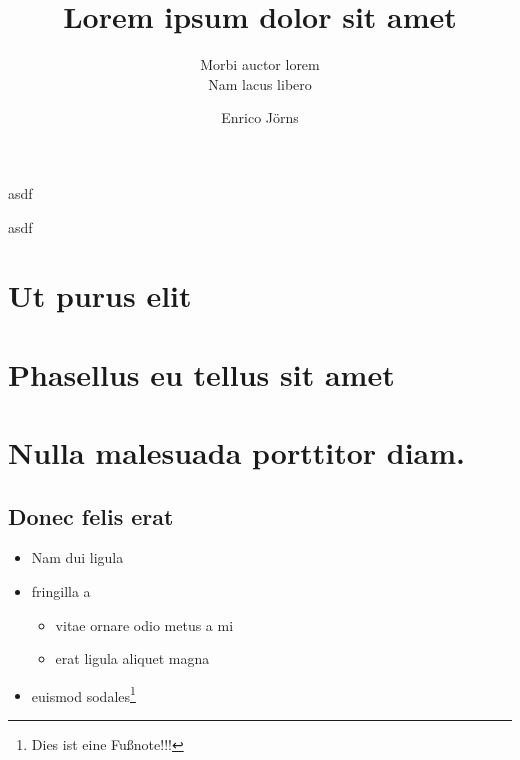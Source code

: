\documentclass[a4paper,extramargin,violet]{tubsartcl}
\title{Lorem ipsum dolor sit amet}
\subtitle{Morbi auctor lorem\vphantom{g}\\ %
Nam lacus libero}
\author{Enrico Jörns}
\begin{document}
\maketitle[image,logo=outside]
\makebackpage
\pagestyle{scrheadings}
\tableofcontents

\begin{gausspage}
  \showtubslogo[right]
  \showdesignhelper
  \begin{segment}[bgcolor=tuSecondaryLight]{2}
    asdf
  \end{segment}
\end{gausspage}

\begin{gausspage}
  \showtubslogo[right]
  \showdesignhelper
  \begin{segment}[bgcolor=tuSecondaryLight]{2}
    asdf
  \end{segment}
\end{gausspage}

\section{Ut purus elit}

\lipsum[1]

% 

\section{Phasellus eu tellus sit amet}

\lipsum[2-5]

\section{Nulla malesuada porttitor diam.}

\lipsum[1-3]

\subsection{Donec felis erat}

\lipsum[4-7]

\begin{itemize}
  \item Nam dui ligula
  \item fringilla a
    \begin{itemize}
      \item vitae ornare odio metus a mi
      \item erat ligula aliquet magna
    \end{itemize}
  \item euismod sodales\footnote{Dies ist eine Fußnote!!!}
\end{itemize}
\end{document}
